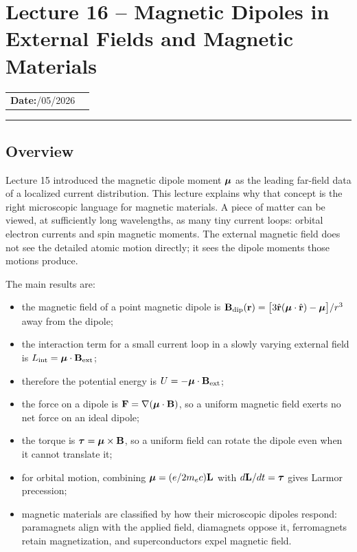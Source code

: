 \section{Lecture 16 -- Magnetic Dipoles in External Fields and Magnetic Materials}\label{sec:lec16}

\begin{center}
\begin{tabular}{ll}
  \textbf{Date:}\quad 31/05/2026 & \\
\end{tabular}
\end{center}
\hrule\vspace{1.5em}

\subsection*{Overview}

Lecture 15 introduced the magnetic dipole moment
$\boldsymbol{\mu}$ as the leading far-field data of a localized current distribution.  This
lecture explains why that concept is the right microscopic language for magnetic
materials.  A piece of matter can be viewed, at sufficiently long wavelengths, as
many tiny current loops: orbital electron currents and spin magnetic moments.  The
external magnetic field does not see the detailed atomic motion directly; it sees
the dipole moments those motions produce.

The main results are:
\begin{itemize}
  \item the magnetic field of a point magnetic dipole is
        $\mathbf{B}_{\rm dip}(\mathbf{r})=\bigl[3\hat{\mathbf{r}}(\boldsymbol{\mu}\cdot\hat{\mathbf{r}})-\boldsymbol{\mu}\bigr]/r^3$
        away from the dipole;
  \item the interaction term for a small current loop in a slowly varying external
        field is $L_{\rm int}=\boldsymbol{\mu}\cdot\mathbf{B}_{\rm ext}$;
  \item therefore the potential energy is $U=-\boldsymbol{\mu}\cdot\mathbf{B}_{\rm ext}$;
  \item the force on a dipole is $\mathbf{F}=\nabla(\boldsymbol{\mu}\cdot\mathbf{B})$, so a uniform
        magnetic field exerts no net force on an ideal dipole;
  \item the torque is $\boldsymbol{\tau}=\boldsymbol{\mu}\times\mathbf{B}$, so a uniform field can
        rotate the dipole even when it cannot translate it;
  \item for orbital motion, combining $\boldsymbol{\mu}=(e/2m_ec)\mathbf{L}$ with
        $d\mathbf{L}/dt=\boldsymbol{\tau}$ gives Larmor precession;
  \item magnetic materials are classified by how their microscopic dipoles respond:
        paramagnets align with the applied field, diamagnets oppose it,
        ferromagnets retain magnetization, and superconductors expel magnetic field.
\end{itemize}

